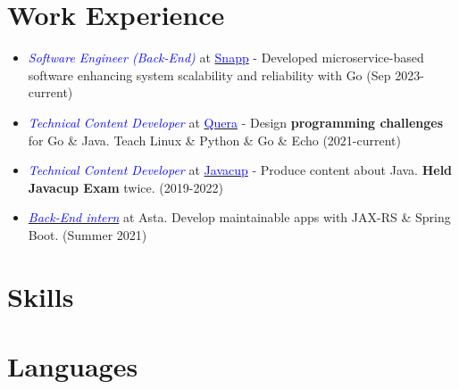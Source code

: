 \documentclass[11pt,a4paper,sans]{moderncv}
\begin{document}
\section{Work Experience}
\begin{itemize}

\item \textit{\textcolor{blue}{Software Engineer (Back-End)}} at \href{https://snapp.ir/about}{\textcolor{blue}{Snapp}} -
    Developed microservice-based software enhancing system scalability and reliability  with Go (Sep 2023-current)

\item \textit{\textcolor{blue}{Technical Content Developer}} at \href{https://quera.org}{\textcolor{blue}{Quera}} - Design \textbf{programming challenges} for Go \& Java. Teach Linux \& Python \& Go \& Echo (2021-current)

\item \textit{\textcolor{blue}{Technical Content Developer}} at {\href{https://javacup.ir}{\textcolor{blue}{Javacup}}} - Produce content about Java. \textbf{Held Javacup Exam} twice. (2019-2022)

\item \textit{{\href{https://asta.ir}{\textcolor{blue}{Back-End intern}}}} at Asta. Develop maintainable apps with JAX-RS \& Spring Boot. (Summer 2021)
\end{itemize}




\vspace{-0.5em}
\section{Skills}


\vspace{-1em}
\section{Languages}
\end{document}
